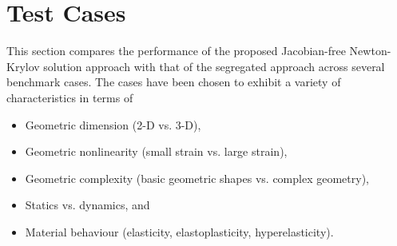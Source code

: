 \documentclass[sn-mathphys,Numbered]{sn-jnl}%
\begin{document}
\section{Test Cases}\label{sec:test_cases}


%	

This section compares the performance of the proposed Jacobian-free Newton-Krylov solution approach with that of the segregated approach across several benchmark cases.
The cases have been chosen to exhibit a variety of characteristics in terms of
\begin{itemize}
	\item Geometric dimension (2-D vs. 3-D),
	\item Geometric nonlinearity (small strain vs. large strain),
	\item Geometric complexity (basic geometric shapes vs. complex geometry),
	\item Statics vs. dynamics, and
	\item Material behaviour (elasticity, elastoplasticity, hyperelasticity).
\end{itemize}
\end{document}
